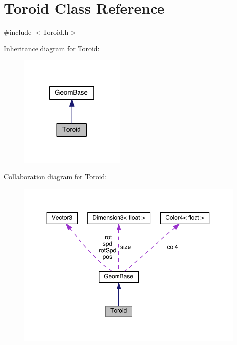 \hypertarget{class_toroid}{\section{Toroid Class Reference}
\label{class_toroid}
}


{\ttfamily \#include $<$Toroid.\-h$>$}



Inheritance diagram for Toroid\-:
\nopagebreak
\begin{figure}[H]
\begin{center}
\leavevmode
\includegraphics[width=146pt]{class_toroid__inherit__graph}
\end{center}
\end{figure}


Collaboration diagram for Toroid\-:
\nopagebreak
\begin{figure}[H]
\begin{center}
\leavevmode
\includegraphics[width=350pt]{class_toroid__coll__graph}
\end{center}
\end{figure}
